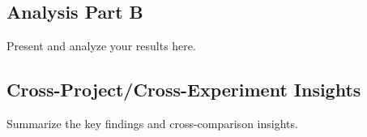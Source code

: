 \subsection{Analysis Part B}

Present and analyze your results here.


\subsection{Cross-Project/Cross-Experiment Insights}

Summarize the key findings and cross-comparison insights.


